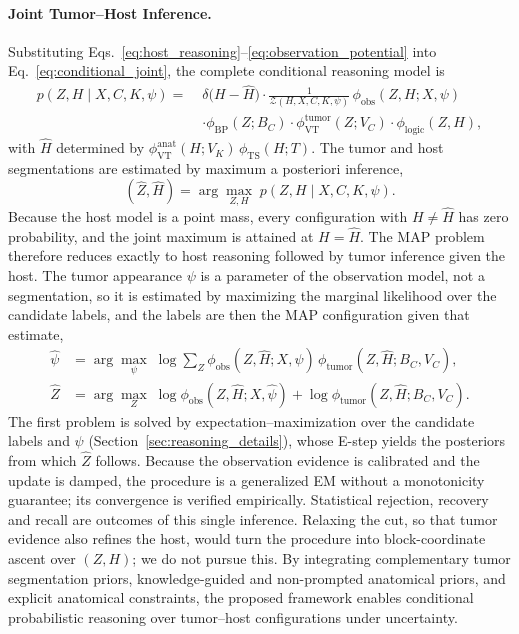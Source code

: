 \documentclass[fleqn,10pt]{olplainarticle}
\begin{document}
\paragraph{Joint Tumor--Host Inference.}

Substituting Eqs.~\eqref{eq:host_reasoning}--\eqref{eq:observation_potential}
into Eq.~\eqref{eq:conditional_joint}, the complete
conditional reasoning model is
\begin{equation}
\label{eq:expanded_reasoning}
\boxed{
\begin{aligned}
p(Z,H\mid X,C,K,\psi)
=\;&\delta\bigl(H-\hat H\bigr)\cdot
\frac{1}{\mathcal{Z}(H,X,C,K,\psi)}\,
\phi_{\mathrm{obs}}(Z,H;X,\psi) \\
&\cdot\phi_{\mathrm{BP}}(Z;B_C) \cdot\phi_{\mathrm{VT}}^{\mathrm{tumor}}
(Z;V_C) \cdot\phi_{\mathrm{logic}}(Z,H),
\end{aligned}
}
\end{equation}
with $\hat H$ determined by
$\phi_{\mathrm{VT}}^{\mathrm{anat}}(H;V_K)\,\phi_{\mathrm{TS}}(H;T)$.
The tumor and host segmentations are estimated by
maximum a posteriori inference,
\begin{equation}
\label{eq:map_inference}
(\hat Z,\hat H)
=
\arg\max_{Z,H}\;
p(Z,H\mid X,C,K,\psi).
\end{equation}
Because the host model is a point mass, every
configuration with $H\neq\hat H$ has zero probability,
and the joint maximum is attained at $H=\hat H$.
The MAP problem therefore reduces exactly to host
reasoning followed by tumor inference given the host.
The tumor appearance $\psi$ is a parameter of the observation
model, not a segmentation, so it is estimated by maximizing the
marginal likelihood over the candidate labels, and the labels
are then the MAP configuration given that estimate,
\begin{equation}
\label{eq:log_inference}
\begin{aligned}
\hat\psi&=\arg\max_{\psi}\;\log\sum_{Z}
\phi_{\mathrm{obs}}(Z,\hat H;X,\psi)\,\phi_{\mathrm{tumor}}(Z,\hat H;B_C,V_C),\\
\hat Z&=\arg\max_{Z}\;
\log\phi_{\mathrm{obs}}(Z,\hat H;X,\hat\psi)
+\log\phi_{\mathrm{tumor}}(Z,\hat H;B_C,V_C).
\end{aligned}
\end{equation}
The first problem is solved by expectation--maximization over the
candidate labels and $\psi$ (Section~\ref{sec:reasoning_details}),
whose E-step yields the posteriors from which $\hat Z$ follows.
Because the observation evidence is calibrated and the update is
damped, the procedure is a generalized EM without a monotonicity
guarantee; its convergence is verified empirically.
Statistical rejection, recovery and recall are outcomes of
this single inference.
Relaxing the cut, so that tumor evidence also refines the
host, would turn the procedure into block-coordinate
ascent over $(Z,H)$; we do not pursue this.
By integrating complementary tumor
segmentation priors, knowledge-guided
and non-prompted anatomical priors,
and explicit anatomical constraints,
the proposed framework enables
conditional probabilistic reasoning
over tumor--host configurations
under uncertainty.
\end{document}
